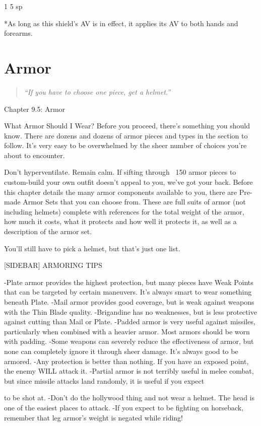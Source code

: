 \documentclass[oneside,11pt,english]{book}
\begin{document}
1 5 sp 

*As long as this shield’s AV is in effect, it applies its AV to both hands and forearms. 

 

\chapter{Armor}
\begin{quote}
	\centering
	\emph{“If you have to choose one piece, get a helmet.” }
\end{quote}
Chapter 9.5: Armor

What Armor Should I Wear?
Before you proceed, there’s something you should know. There are dozens and dozens of armor pieces and types in 
the section to follow. It’s very easy to be overwhelmed by the sheer number of choices you’re about to encounter. 

Don’t hyperventilate. Remain calm. If sifting through ~150 armor pieces to custom-build your own outfit doesn’t 
appeal to you, we’ve got your back. Before this chapter details the many armor components available to you, there are
Pre-made Armor Sets that you can choose from. These are full suits of armor (not including helmets) complete with 
references for the total weight of the armor, how much it costs, what it protects and how well it protects it, as well as a
description of the armor set.

You’ll still have to pick a helmet, but that’s just one list.

[SIDEBAR] ARMORING TIPS

-Plate armor provides the highest protection, but many pieces have Weak Points that can be targeted by certain 
maneuvers. It’s always smart to wear something beneath Plate.
-Mail armor provides good coverage, but is weak against weapons with the Thin Blade quality.
-Brigandine has no weaknesses, but is less protective against cutting than Mail or Plate.
-Padded armor is very useful against missiles, particularly when combined with a heavier armor. Most armors should 
be worn with padding.
-Some weapons can severely reduce the effectiveness of armor, but none can completely ignore it through sheer 
damage. It’s always good to be armored.
-Any protection is better than nothing. If you have an exposed point, the enemy WILL attack it. 
-Partial armor is not terribly useful in melee combat, but since missile attacks land randomly, it is useful if you expect 


to be shot at.
-Don’t do the hollywood thing and not wear a helmet. The head is one of the easiest places to attack.
-If you expect to be fighting on horseback, remember that leg armor’s weight is negated while riding!
\end{document}
